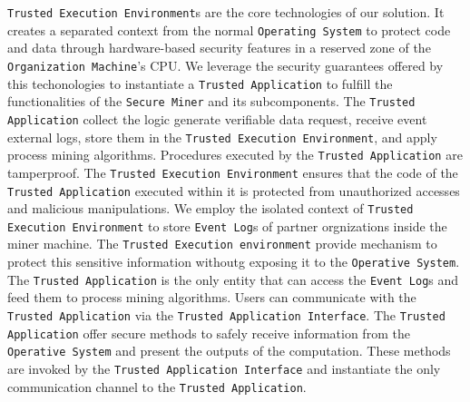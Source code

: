 \texttt{Trusted Execution Environment}s are the core technologies of our solution. It creates a separated context from the normal \texttt{Operating System} to protect code and data through hardware-based security features in a reserved zone of the \texttt{Organization Machine}'s CPU. We leverage the security guarantees offered by this techonologies to instantiate a \texttt{Trusted Application} to fulfill the functionalities of the \texttt{Secure Miner} and its subcomponents. The \texttt{Trusted Application} collect the logic generate verifiable data request, receive event external logs, store them in the \texttt{Trusted Execution Environment}, and apply process mining algorithms. Procedures executed by the \texttt{Trusted Application} are tamperproof. The \texttt{Trusted Execution Environment} ensures that the code of the \texttt{Trusted Application} executed within it is protected from unauthorized accesses and malicious manipulations. We employ the isolated context of \texttt{Trusted Execution Environment} to store \texttt{Event Log}s of partner orgnizations inside the miner machine. The \texttt{Trusted Execution environment} provide mechanism to protect this sensitive information withoutg exposing it to the \texttt{Operative System}. The \texttt{Trusted Application} is the only entity that can access the \texttt{Event Log}s and feed them to process mining algorithms. Users can communicate with the \texttt{Trusted Application} via the \texttt{Trusted Application Interface}. The \texttt{Trusted Application} offer secure methods to safely receive information from  the \texttt{Operative System} and present the outputs of the computation. These methods are invoked by the \texttt{Trusted Application Interface} and instantiate the only communication channel to the \texttt{Trusted Application}.
%



